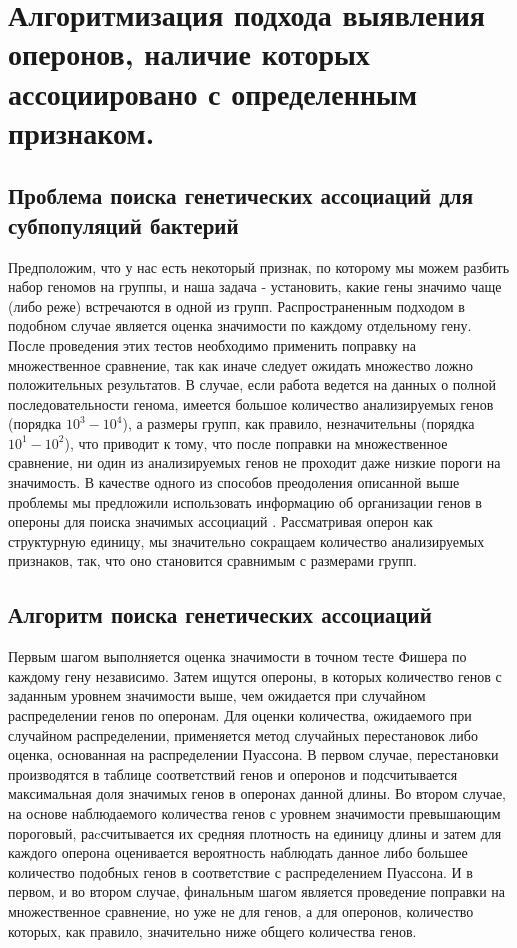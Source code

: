 
\section{Алгоритмизация подхода выявления оперонов, наличие которых ассоциировано с определенным признаком. } \label{chaptOperons}

\subsection{Проблема поиска генетических ассоциаций для субпопуляций бактерий}
Предположим, что у нас есть некоторый признак, по которому мы можем разбить набор геномов на группы, и наша задача - установить, какие гены значимо чаще (либо реже) встречаются в одной из групп. Распространенным подходом в подобном случае является оценка значимости по каждому отдельному гену. После проведения этих тестов необходимо применить поправку на множественное сравнение, так как иначе следует ожидать множество ложно положительных результатов. В случае, если работа ведется на данных о полной последовательности генома, имеется большое количество анализируемых генов (порядка $10^3 - 10^4$), а размеры групп, как правило, незначительны (порядка $10^1 - 10^2$), что приводит к тому, что после поправки на множественное сравнение, ни один из анализируемых генов не проходит даже низкие пороги на значимость. В качестве одного из способов преодоления описанной выше проблемы мы предложили использовать информацию об организации генов в опероны для поиска значимых ассоциаций \cite{rakitina2017genome}. Рассматривая оперон как структурную единицу, мы значительно сокращаем количество анализируемых признаков, так, что оно становится сравнимым с размерами групп.

\subsection{Алгоритм поиска генетических ассоциаций}
Первым шагом выполняется оценка значимости в точном тесте Фишера по каждому гену независимо. Затем ищутся опероны, в которых количество генов с заданным уровнем значимости выше, чем ожидается при случайном распределении генов по оперонам. Для оценки количества, ожидаемого при случайном распределении, применяется метод случайных перестановок либо оценка, основанная на распределении Пуассона. В первом случае, перестановки производятся в таблице соответствий генов и оперонов и подсчитывается максимальная доля значимых генов в оперонах данной длины. Во втором случае, на основе наблюдаемого количества генов с уровнем значимости превышающим пороговый, раcсчитывается их средняя плотность на единицу длины и затем для каждого оперона оценивается вероятность наблюдать данное либо большее количество подобных генов в соответствие с распределением Пуассона. И в первом, и во втором случае, финальным шагом является проведение поправки на множественное сравнение, но уже не для генов, а для оперонов, количество которых, как правило, значительно ниже общего количества генов.

